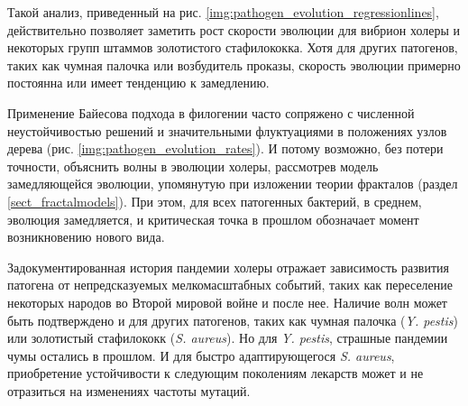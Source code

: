 Такой анализ, приведенный на рис. \ref{img:pathogen_evolution_regressionlines}, действительно позволяет заметить рост скорости эволюции для вибрион холеры и некоторых групп штаммов золотистого стафилококка. Хотя для других патогенов, таких как чумная палочка или возбудитель проказы, скорость эволюции примерно постоянна или имеет тенденцию к замедлению.

Применение Байесова подхода в филогении часто сопряжено с численной неустойчивостью решений и значительными флуктуациями в положениях узлов дерева (рис. \ref{img:pathogen_evolution_rates}). И потому возможно, без потери точности, объяснить волны в эволюции холеры, рассмотрев модель замедляющейся эволюции, упомянутую при изложении теории фракталов (раздел \ref{sect_fractalmodels}). При этом, для всех патогенных бактерий, в среднем, эволюция замедляется, и критическая точка в прошлом обозначает момент возникновению нового вида. 

Задокументированная история пандемии холеры отражает зависимость развития патогена от непредсказуемых мелкомасштабных событий, таких как переселение некоторых народов во Второй мировой войне и после нее. Наличие волн может быть подтверждено и для других патогенов, таких как чумная палочка (\textit{Y. pestis}) или золотистый стафилококк (\textit{S. aureus}). Но для \textit{Y. pestis}, страшные пандемии чумы остались в прошлом. И для быстро адаптирующегося \textit{S. aureus}, приобретение устойчивости к следующим поколениям лекарств может и не отразиться на изменениях частоты мутаций. 



